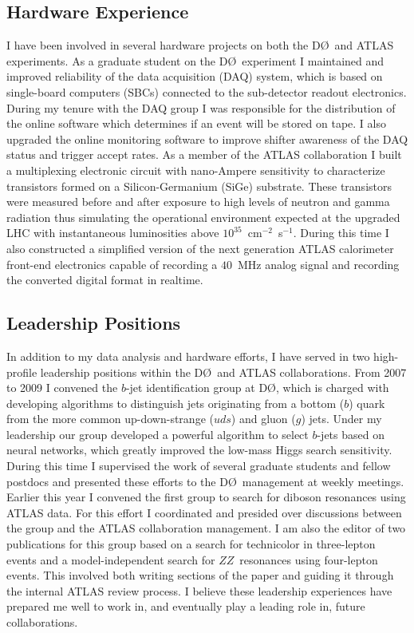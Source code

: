 \documentclass[12pt]{article}
\newcommand{\dzero}{D\O}
\begin{document}
\subsection{Hardware Experience}
I have been involved in several hardware projects on both the \dzero~and ATLAS experiments. As a graduate student on the \dzero~experiment I maintained and improved reliability of the data acquisition (DAQ) system, which is based on single-board computers (SBCs) connected to the sub-detector readout electronics. During my tenure with the DAQ group I was responsible for the distribution of the online software which determines if an event will be stored on tape. I also upgraded the online monitoring software to improve shifter awareness of the DAQ status and trigger accept rates. As a member of the ATLAS collaboration I built a multiplexing electronic circuit with nano-Ampere sensitivity to characterize transistors formed on a Silicon-Germanium (SiGe) substrate. These transistors were measured before and after exposure to high levels of neutron and gamma radiation thus simulating the operational environment expected at the upgraded LHC with instantaneous luminosities above \mbox{$10^{35}$~cm$^{-2}$ s$^{-1}$}. During this time I also constructed a simplified version of the next generation ATLAS calorimeter front-end electronics capable of recording a $40$~MHz analog signal and recording the converted digital format in realtime. 

\subsection{Leadership Positions}
In addition to my data analysis and hardware efforts, I have served in two high-profile leadership positions within the \dzero~and ATLAS collaborations. From 2007 to 2009 I convened the $b$-jet identification group at \dzero, which is charged with developing algorithms to distinguish jets originating from a bottom ($b$) quark from the more common up-down-strange ($uds$) and gluon ($g$) jets. Under my leadership our group developed a powerful algorithm to select $b$-jets based on neural networks, which greatly improved the low-mass Higgs search sensitivity. During this time I supervised the work of several graduate students and fellow  postdocs and presented these efforts to the \dzero~management at weekly meetings. Earlier this year I convened the first group to search for diboson resonances using ATLAS data. For this effort I coordinated and presided over discussions between the group and the ATLAS collaboration management. I am also the editor of two publications for this group based on a search for technicolor in three-lepton events and a model-independent search for $ZZ$~resonances using four-lepton events. This involved both writing sections of the paper and guiding it through the internal ATLAS review process. I believe these leadership experiences have prepared me well to work in, and eventually play a leading role in, future collaborations.
\end{document}
